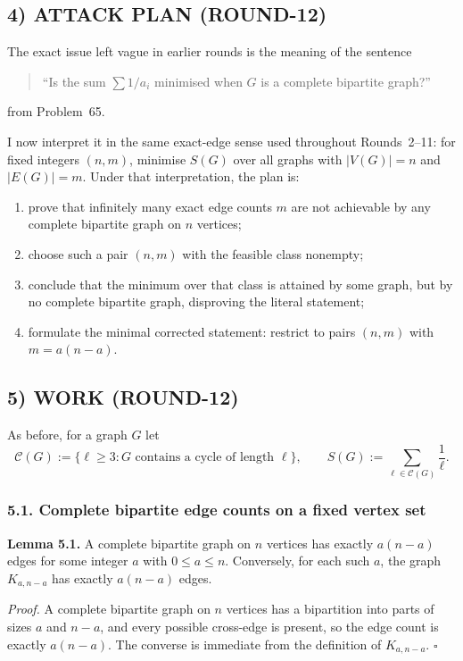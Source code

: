 \subsection*{4) ATTACK PLAN (ROUND-12)}

The exact issue left vague in earlier rounds is the meaning of the sentence
\begin{quote}
``Is the sum $\sum 1/a_i$ minimised when $G$ is a complete bipartite graph?''
\end{quote}
from Problem~65.

I now interpret it in the same exact-edge sense used throughout Rounds~2--11:
for fixed integers $(n,m)$, minimise $S(G)$ over all graphs with $|V(G)|=n$ and $|E(G)|=m$.
Under that interpretation, the plan is:
\begin{enumerate}
\item prove that infinitely many exact edge counts $m$ are not achievable by any complete bipartite graph on $n$ vertices;
\item choose such a pair $(n,m)$ with the feasible class nonempty;
\item conclude that the minimum over that class is attained by some graph, but by no complete bipartite graph, disproving the literal statement;
\item formulate the minimal corrected statement: restrict to pairs $(n,m)$ with $m=a(n-a)$.
\end{enumerate}

\subsection*{5) WORK (ROUND-12)}

As before, for a graph $G$ let
\[
\mathcal C(G):=\{\ell\ge 3:\text{$G$ contains a cycle of length $\ell$}\},
\qquad
S(G):=\sum_{\ell\in\mathcal C(G)}\frac1\ell.
\]

\subsubsection*{5.1. Complete bipartite edge counts on a fixed vertex set}

\textbf{Lemma 5.1.}
A complete bipartite graph on $n$ vertices has exactly $a(n-a)$ edges for some integer $a$ with $0\le a\le n$.
Conversely, for each such $a$, the graph $K_{a,n-a}$ has exactly $a(n-a)$ edges.

\medskip
\textit{Proof.}
A complete bipartite graph on $n$ vertices has a bipartition into parts of sizes $a$ and $n-a$, and every possible cross-edge is present, so the edge count is exactly $a(n-a)$.
The converse is immediate from the definition of $K_{a,n-a}$.
\hfill$\square$

